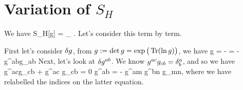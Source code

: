 \section{\texorpdfstring{Variation of $S_H$}{Variation of S\_H}}

We have 
\bse
    \del S_H[g] = \int_{\cM} .
\ese 
Let's consider this term by term. 

First let's consider $\delta g$, from $g := \det g = \exp\big(\Tr(\ln g)\big)$, we have 
\bse 
    \del g = - = -\cdot g^{ab}\cdot \del g_{ab}
\ese 
Next, let's look at $\delta g^{ab}$. We know $g^{ac}g_{cb} = \delta^a_b$, and so we have
\bse 
    \del g^{ac}\cdot g_{cb} + g^{ac} \cdot \del g_{cb} = 0 \qquad \implies \qquad \del g^{ab} = - g^{am} \cdot g^{bn} \cdot \del g_{mn},
\ese
where we have relabelled the indices on the latter equation.


